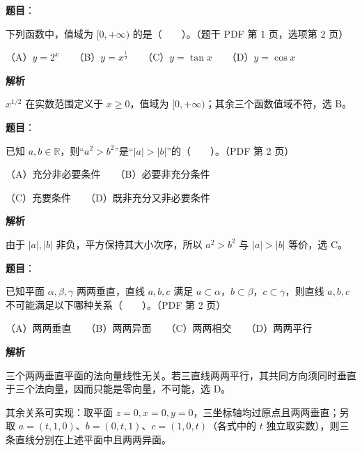 \begin{answer}

\textbf{题目}：

下列函数中，值域为 $[0,+\infty)$ 的是\mbox{（　　）}。（题干 PDF 第 1 页，选项第 2 页）

（A）$y=2^x$　　（B）$y=x^{\frac12}$　　（C）$y=\tan x$　　（D）$y=\cos x$

\textbf{解析}

$x^{1/2}$ 在实数范围定义于 $x\ge0$，值域为 $[0,+\infty)$；其余三个函数值域不符，选 B。


\end{answer}
\begin{answer}

\textbf{题目}：

已知 $a,b\in\mathbb R$，则“$a^2>b^2$”是“$|a|>|b|$”的\mbox{（　　）}。（PDF 第 2 页）

（A）充分非必要条件　　（B）必要非充分条件

（C）充要条件　　（D）既非充分又非必要条件

\textbf{解析}

由于 $|a|,|b|$ 非负，平方保持其大小次序，所以 $a^2>b^2$ 与 $|a|>|b|$ 等价，选 C。


\end{answer}
\begin{answer}

\textbf{题目}：

已知平面 $\alpha,\beta,\gamma$ 两两垂直，直线 $a,b,c$ 满足 $a\subset\alpha$，$b\subset\beta$，$c\subset\gamma$，则直线 $a,b,c$ 不可能满足以下哪种关系\mbox{（　　）}。（PDF 第 2 页）

（A）两两垂直　　（B）两两异面　　（C）两两相交　　（D）两两平行

\textbf{解析}

三个两两垂直平面的法向量线性无关。若三直线两两平行，其共同方向须同时垂直于三个法向量，因而只能是零向量，不可能，选 D。

其余关系可实现：取平面 $z=0,x=0,y=0$，三坐标轴均过原点且两两垂直；另取 $a=(t,1,0)$、$b=(0,t,1)$、$c=(1,0,t)$（各式中的 $t$ 独立取实数），则三条直线分别在上述平面中且两两异面。


\end{answer}
